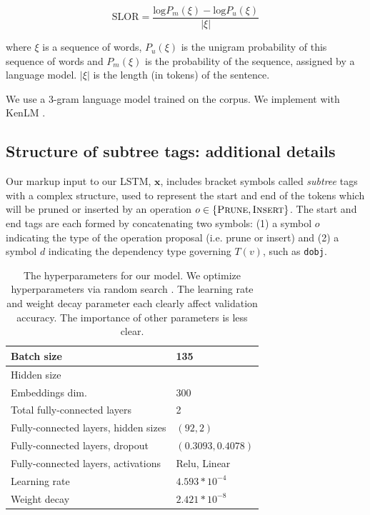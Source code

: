 \begin{equation}
\text{SLOR}=\frac{\text{log}P_m(\xi) - \text{log}P_u(\xi)}{|\xi|}
\end{equation}

where $\xi$ is a sequence of words, $P_u(\xi)$ is the unigram probability of this sequence of words and $P_m(\xi)$ is the probability of the sequence, assigned by a language model.  $|\xi|$ is the length (in tokens) of the sentence.

We use a 3-gram language model trained on the \citet{filippova2013overcoming} corpus. We implement with KenLM \cite{Heafield-kenlm}.

\subsection{Structure of subtree tags: additional details}\label{s:subtree}

Our markup input to our LSTM, $\bm{x}$, includes bracket symbols called \textit{subtree} tags with a complex structure, used to represent the start and end of the tokens which will be pruned or inserted by an operation $o \in \{ \textsc{Prune},\textsc{Insert}\}$. The start and end tags are each formed by concatenating two symbols: (1) a symbol $o$ indicating the type of the operation proposal (i.e. prune or insert) and (2) a symbol $d$ indicating the dependency type governing $T(v)$, such as \texttt{dobj}. 

\begin{table}[]
\begin{tabular}{@{}ll@{}}
\toprule
Batch size         & 135                      \\ \midrule
Hidden size        &                          \\
Embeddings dim.    & 300                      \\
Total fully-connected layers & 2                        \\
Fully-connected layers, hidden sizes & $(92, 2)$ \\
Fully-connected layers, dropout & $(0.3093, 0.4078)$ \\
Fully-connected layers, activations        & Relu, Linear             \\
Learning rate      & $4.593 * 10^{-4}$   \\
Weight decay       & $2.421 * 10^{-8}$   \\ \bottomrule
\end{tabular}
\caption{The hyperparameters for our model. We optimize hyperparameters via random search \cite{Bergstra2012RandomSF}. The learning rate and weight decay parameter each clearly affect validation accuracy. The importance of other parameters is less clear. } 
\end{table}

